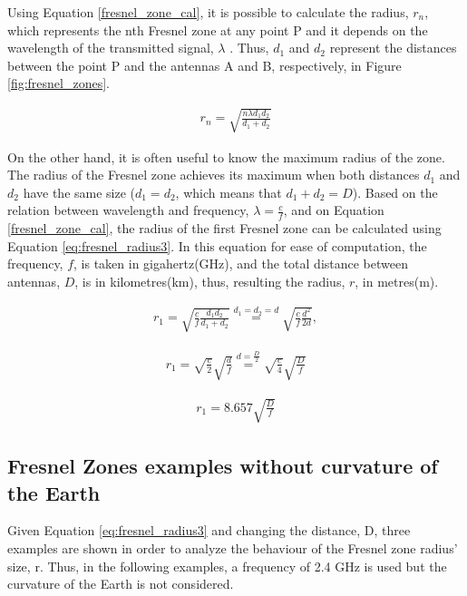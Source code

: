 Using Equation \ref{fresnel_zone_cal}, it is possible to calculate the radius, $r_n$, which represents the nth Fresnel zone at any point P and it depends on the wavelength of the transmitted signal, $\lambda$ \cite{fresnelWiki}. Thus, $d_1$ and $d_2$ represent the distances between the point P and the antennas A and B, respectively, in Figure \ref{fig:fresnel_zones}.

\begin{align}
r_n = \sqrt{\frac{n \lambda d_1 d_2}{d_1+d_2}} \label{fresnel_zone_cal}
\end{align}

On the other hand, it is often useful to know the maximum radius of the zone. The radius of the Fresnel zone achieves its maximum when both distances $d_1$ and $d_2$ have the same size ($d_1=d_2$, which means that $d_1+d_2=D$). Based on the relation between wavelength and frequency, $\lambda = \frac{c}{f}$, and on Equation \ref{fresnel_zone_cal}, the radius of the first Fresnel zone can be calculated using Equation \ref{eq:fresnel_radius3}. In this equation for ease of computation, the frequency, $f$, is taken in gigahertz(GHz), and the total distance between antennas, $D$, is in kilometres(km), thus, resulting the radius, $r$, in metres(m). 

\begin{align}
r_1 = \sqrt{\frac{c}{f}\frac{d_1 d_2}{d_1+d_2}} \stackrel{d_1=d_2=d}{=} \sqrt{\frac{c}{f}\frac{d^2}{2d}},  \label{eq:fresnel_radius1}
\end{align}

\begin{align}
r_1 = \sqrt{\frac{c}{2}}\sqrt{\frac{d}{f}} \stackrel{d=\frac{D}{2}}{=} \sqrt{\frac{c}{4}}\sqrt{\frac{D}{f}} \label{eq:fresnel_radius2}
\end{align}

\begin{align}
r_1 = 8.657 \sqrt{\frac{D}{f}} \label{eq:fresnel_radius3}
\end{align}

\subsection*{Fresnel Zones examples without curvature of the Earth}
Given Equation \ref{eq:fresnel_radius3} and changing the distance, D, three examples are shown in order to analyze the behaviour of the Fresnel zone radius' size, r. Thus, in the following examples, a frequency of 2.4 GHz is used but the curvature of the Earth is not considered. 

